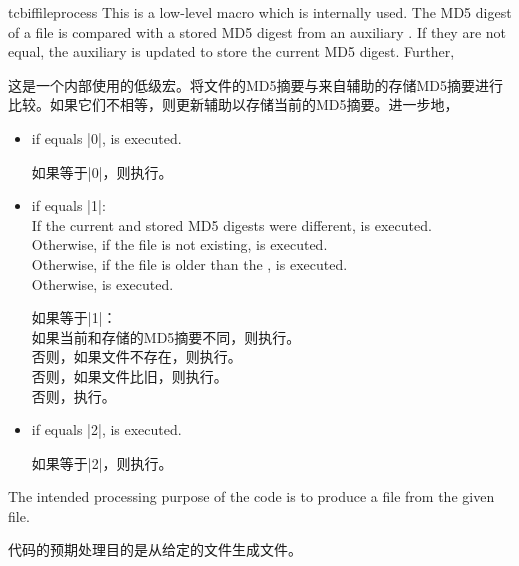 \begin{docCommand}[doc new=2016-07-14]{tcbiffileprocess}{}
This is a low-level macro which is internally used.
The MD5 digest of a  file is compared with
a stored MD5 digest from an auxiliary .
If they are not equal, the auxiliary  is updated to
store the current MD5 digest. Further,

这是一个内部使用的低级宏。将文件的MD5摘要与来自辅助的存储MD5摘要进行比较。如果它们不相等，则更新辅助以存储当前的MD5摘要。进一步地，
\begin{itemize}
\item if  equals |0|,  is executed.

如果等于|0|，则执行。
\item if  equals |1|:\\
If the current and stored MD5 digests were different,  is executed.\\
Otherwise, if the  file is not existing,  is executed.\\
Otherwise, if the  file is older than the ,  is executed.\\
Otherwise,  is executed.

如果等于|1|：\\
如果当前和存储的MD5摘要不同，则执行。\\
否则，如果文件不存在，则执行。\\
否则，如果文件比旧，则执行。\\
否则，执行。
\item if  equals |2|,  is executed.

如果等于|2|，则执行。
\end{itemize}
The intended processing purpose of the  code is to produce a 
file from the given  file.

代码的预期处理目的是从给定的文件生成文件。
\end{docCommand}
